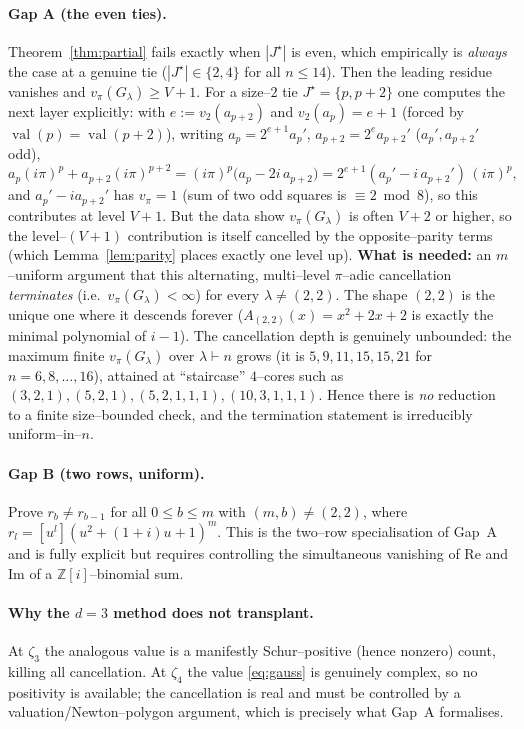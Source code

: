 \documentclass[11pt]{article}
\theoremstyle{definition}
\DeclareMathOperator{\val}{val}
\newcommand{\la}{\lambda}
\newcommand{\Z}{\mathbb{Z}}
\begin{document}
\paragraph{Gap A (the even ties).}  Theorem~\ref{thm:partial} fails exactly when
$|J^\star|$ is even, which empirically is \emph{always} the case at a genuine tie
($|J^\star|\in\{2,4\}$ for all $n\le14$).  Then the leading residue vanishes and
$v_\pi(G_\la)\ge V+1$.  For a size--$2$ tie $J^\star=\{p,p+2\}$ one computes the
next layer explicitly: with $e:=v_2(a_{p+2})$ and $v_2(a_p)=e+1$ (forced by
$\val(p)=\val(p+2)$), writing $a_p=2^{e+1}a_p'$, $a_{p+2}=2^e a_{p+2}'$
($a_p',a_{p+2}'$ odd),
\[
a_p(i\pi)^p+a_{p+2}(i\pi)^{p+2}=(i\pi)^p\bigl(a_p-2i\,a_{p+2}\bigr)
=2^{e+1}(a_p'-i\,a_{p+2}')\,(i\pi)^p,
\]
and $a_p'-i a_{p+2}'$ has $v_\pi=1$ (sum of two odd squares is $\equiv2\bmod8$),
so this contributes at level $V+1$.  But the data show $v_\pi(G_\la)$ is often
$V+2$ or higher, so the level--$(V+1)$ contribution is itself cancelled by the
opposite--parity terms (which Lemma~\ref{lem:parity} places exactly one level up).
\textbf{What is needed:} an $m$--uniform argument that this alternating, multi--level
$\pi$--adic cancellation \emph{terminates} (i.e.\ $v_\pi(G_\la)<\infty$) for every
$\la\ne(2,2)$.  The shape $(2,2)$ is the unique one where it descends forever
($A_{(2,2)}(x)=x^2+2x+2$ is exactly the minimal polynomial of $i-1$).
The cancellation depth is genuinely unbounded: the maximum finite $v_\pi(G_\la)$ over
$\la\vdash n$ grows (it is $5,9,11,15,15,21$ for $n=6,8,\dots,16$), attained at
``staircase'' $4$--cores such as $(3,2,1),(5,2,1),(5,2,1,1,1),(10,3,1,1,1)$.
Hence there is \emph{no} reduction to a finite size--bounded check, and the
termination statement is irreducibly uniform--in--$n$.

\paragraph{Gap B (two rows, uniform).}  Prove $r_b\ne r_{b-1}$ for all
$0\le b\le m$ with $(m,b)\ne(2,2)$, where $r_l=[u^l](u^2+(1+i)u+1)^m$.  This is the
two--row specialisation of Gap~A and is fully explicit but requires controlling the
simultaneous vanishing of $\mathrm{Re}$ and $\mathrm{Im}$ of a $\Z[i]$--binomial sum.

\paragraph{Why the $d=3$ method does not transplant.}  At $\zeta_3$ the analogous
value is a manifestly Schur--positive (hence nonzero) count, killing all
cancellation.  At $\zeta_4$ the value \eqref{eq:gauss} is genuinely complex, so no
positivity is available; the cancellation is real and must be controlled by a
valuation/Newton--polygon argument, which is precisely what Gap~A formalises.
\end{document}
